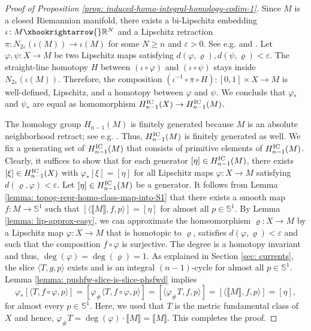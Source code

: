 \documentclass{amsart}
\numberwithin{equation}{section}
\newcommand{\R}{\mathbb{R}}
\newcommand{\bb}[1]{\llbracket #1\rrbracket}
\begin{document}
    
    \begin{proof}[Proof of Proposition \ref{prop: induced-homo-integral-homology-codim-1}]        
        Since $M$ is a closed Riemannian manifold, there exists a bi-Lipschitz embedding $\iota\colon M \xhookrightarrow{} \R^N$ and a Lipschitz retraction $\pi \colon N_{2\varepsilon}(\iota(M)) \to \iota(M)$ for some $N\geq n$ and $\varepsilon>0$. See e.g. \cite[Theorem 3.10]{Heinonen-geom-embeddings} and \cite[Theorem 3.1]{hohti-1993}. Let $\varphi,\psi \colon X \to M$ be two Lipschitz maps satisfying $d(\varphi,\varrho),d(\psi,\varrho)<\varepsilon$. The straight-line homotopy $H$ between $(\iota \circ\varphi)$ and $(\iota \circ\psi)$ stays inside $N_{2\varepsilon}(\iota(M))$. Therefore, the composition $(\iota^{-1}\circ \pi\circ H)\colon [0,1]\times X \to M$ is well-defined, Lipschitz, and a homotopy between $\varphi$ and $\psi$. We conclude that $\varphi_*$ and $\psi_*$ are equal as homomorphism $ H_{n-1}^\textup{IC}(X)\to H_{n-1}^\textup{IC}(M)$.

        \medskip
        The homology group $H_{n-1}(M)$ is finitely generated because $M$ is an absolute neighborhood retract; see e.g. \cite[Corollary A.8]{Hatcher}. Thus, $H_{n-1}^\textup{IC}(M)$ is finitely generated as well. We fix a generating set of $H_{n-1}^\textup{IC}(M)$ that consists of primitive elements of $H_{n-1}^\textup{IC}(M)$. Clearly, it suffices to show that for each generator $[\eta] \in H_{n-1}^\textup{IC}(M)$, there exists $[\xi] \in H_{n-1}^\textup{IC}(X)$ with $\varphi_*[\xi] = [\eta]$ for all Lipschitz maps $\varphi\colon X \to M$ satisfying $d(\varrho,\varphi) < \varepsilon$. Let $[\eta] \in H_{n-1}^\textup{IC}(M)$ be a generator. It follows from Lemma \ref{lemma: topog-repr-homo-class-map-into-S1} that there exists a smooth map $f\colon M \to \mathbb{S}^1$ such that $ [\langle \bb{M},f,p\rangle]= [\eta]$ for almost all $p\in \mathbb{S}^1$. By Lemma \ref{lemma: lip-approx-easy}, we can approximate the homeomorphism $\varrho\colon X \to M$ by a Lipschitz map $\varphi\colon X\to M$ that is homotopic to $\varrho$, satisfies $d(\varphi,\varrho)<\varepsilon$ and such that the composition $f\circ \varphi$ is surjective. The degree is a homotopy invariant and thus, $\deg(\varphi) = \deg(\varrho) = 1$. As explained in Section \ref{sec: currents}, the slice $\langle T, g,p\rangle$ exists and is an integral $(n-1)$-cycle for almost all $p \in \mathbb{S}^1$. Lemma \ref{lemma: pushfw-slice-is-slice-phsfwd} implies 
        $$\varphi_*[\langle T,f\circ \varphi,p\rangle]=[\varphi_\#\langle T,f\circ \varphi,p\rangle] = [\langle \varphi_\# T, f,p\rangle]=  [\langle \bb{M}, f,p\rangle] = [\eta],$$
        for almost every $p\in \mathbb{S}^1$. Here, we used that $T$ is the metric fundamental class of $X$ and hence, $\varphi_\#T = \deg(\varphi) \cdot \bb{M} = \bb{M}$. This completes the proof. 
    \end{proof}
\end{document}

